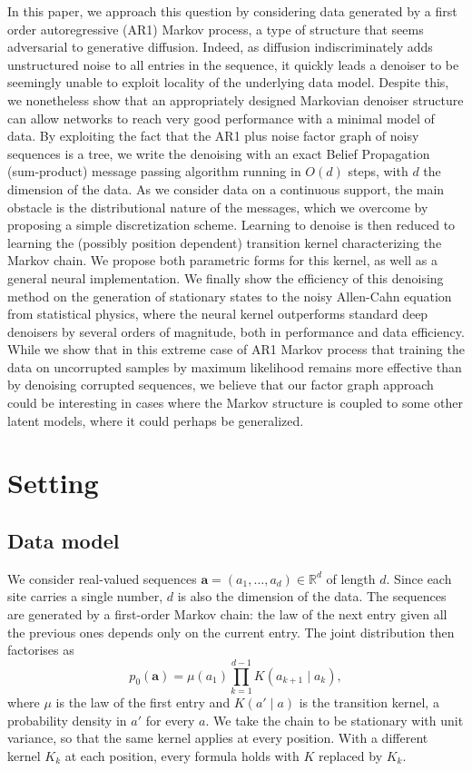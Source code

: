 \documentclass{article}
\begin{document}
{In this paper, we approach this question by considering data generated by a first order autoregressive (AR1) Markov process, a type of structure that seems adversarial to generative diffusion. Indeed, as diffusion indiscriminately adds unstructured noise to all entries in the sequence, it quickly leads a denoiser to be seemingly unable to exploit locality of the underlying data model. Despite this, we nonetheless show that an appropriately designed Markovian denoiser structure can allow networks to reach very good performance with a minimal model of data. By exploiting the fact that the AR1 plus noise factor graph of noisy sequences is a tree, we write the denoising with an exact Belief Propagation (sum-product) message passing algorithm running in $O(d)$ steps, with $d$ the dimension of the data. As we consider data on a continuous support, the main obstacle is the distributional nature of the messages, which we overcome by proposing a simple discretization scheme. Learning to denoise is then reduced to learning the (possibly position dependent) transition kernel characterizing the Markov chain. We propose both parametric forms for this kernel, as well as a general neural implementation. We finally show the efficiency of this denoising method on the generation of stationary states to the noisy Allen-Cahn equation from statistical physics, where the neural kernel outperforms standard deep denoisers by several orders of magnitude, both in performance and data efficiency. While we show that in this extreme case of AR1 Markov process that training the data on uncorrupted samples by maximum likelihood remains more effective than by denoising corrupted sequences, we believe that our factor graph approach could be interesting in cases where the Markov structure is coupled to some other latent models, where it could perhaps be generalized. 

}

\section{Setting}
\label{sec:setting}

\subsection{Data model}
We consider real-valued sequences $\mathbf{a}=(a_1,\ldots,a_d)\in\mathbb{R}^d$ of length $d$. Since each site
carries a single number, $d$ is also the dimension of the data. The sequences are generated by a first-order Markov chain: the law of the next entry given all the previous ones
depends only on the current entry. The joint distribution then factorises as
\begin{equation}
p_0(\mathbf{a})
=
\mu(a_1)
\prod_{k=1}^{d-1}
K(a_{k+1}\mid a_k),
\label{eq:markov_prior}
\end{equation}
where $\mu$ is the law of the first entry and $K(a'\mid a)$ is the transition kernel, a probability density in $a'$ for
every $a$. We take the chain to be stationary with unit variance, so that the same kernel applies at every position.
With a different kernel $K_k$ at each position, every formula holds with $K$ replaced by $K_k$.
\end{document}
